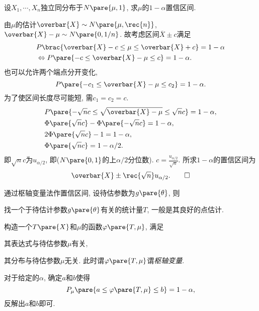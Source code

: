 \documentclass[../Statistics.tex]{subfiles}
\begin{document}
\begin{sample}
    \begin{ex}
        设$X_1,\cdots, X_n$独立同分布于$N\pare{\mu,1}$, 求$\mu$的$1-\alpha$置信区间.
    \end{ex}
    \begin{solution}
        由$\mu$的估计$\overbar{X} \sim N\pare{\mu,\rec{n}}$, $\overbar{X} - \mu \sim N\pare{0,1/n}$. 故考虑区间$\overbar{X}\pm c$满足
        \begin{align*}
            & P\brac{\overbar{X}-c \le \mu \le \overbar{X}+c} = 1-\alpha \\
            & \Leftrightarrow P\pare{-c \le \overbar{X}-\mu \le c} = 1-\alpha.
        \end{align*}
        也可以允许两个端点分开变化,
        \[ P\pare{-c_1 \le \overbar{X} - \mu \le c_2} = 1-\alpha. \]
        为了使区间长度尽可能短, 需$c_1 = c_2 = c$.
        \begin{align*}
            & P\pare{-\sqrt{n}c \le \sqrt{\overbar{X} - \mu} \le \sqrt{n}c} = 1-\alpha, \\
            & \Phi\pare{\sqrt{n}c} - \Phi\pare{-\sqrt{n}c} = 1-\alpha, \\
            & 2\Phi\pare{\sqrt{n}c} - 1 = 1-\alpha, \\
            & \Phi\pare{\sqrt{n}c} = 1-\alpha/2.
        \end{align*}
        即$\sqrt{n}c$为$u_{\alpha/2}$, 即($N\pare{0,1}$的上$\alpha/2$分位数). $\displaystyle c = \frac{u_{\alpha/2}}{\sqrt{n}}$. 所求$1-\alpha$的置信区间为
        \[ \overbar{X} \pm \rec{\sqrt{n}} u_{\alpha/2}. \qedhere \]
    \end{solution}
\end{sample}
通过枢轴变量法作置信区间, 设待估参数为$g\pare{\theta}$, 则
\begin{cenum}
    \item 找一个于待估计参数$g\pare{\theta}$有关的统计量$T$, 一般是其良好的点估计.
    \item 构造一个$T\pare{X}$和$\mu$的函数$\varphi\pare{T,\mu}$, 满足
    \begin{cenum}
        \item 其表达式与待估参数$\mu$有关,
        \item 其分布与待估参数$\mu$无关. 此时谓$\varphi\pare{T,\mu}$谓\emph{枢轴变量}.
    \end{cenum}
    \item 对于给定的$\alpha$, 确定$a$和$b$使得
    \[ P_\mu\pare{a\le \varphi\pare{T,\mu}\le b} = 1-\alpha, \]
    反解出$a$和$b$即可.
\end{cenum}
\end{document}
